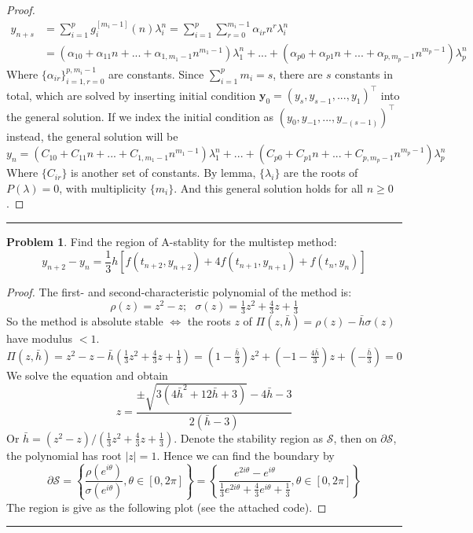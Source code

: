 \documentclass[a4paper, 10pt]{article}
\theoremstyle{definition}
\newtheorem{problem}{Problem}
\theoremstyle{hSol}
\begin{document}
\begin{proof}
\begin{equation}
\begin{split}
    y_{n+s} &= \sum_{i=1}^p g^{[m_i-1]}_i(n) \lambda_i^n = \sum_{i=1}^p  \sum_{r=0}^{m_i-1} \alpha_{ir} n^r \lambda_i^n \\
    &= (\alpha_{10} + \alpha_{11}n + ... + \alpha_{1,m_1-1} n^{m_1-1}) \lambda_1^n + ... + (\alpha_{p0} + \alpha_{p1}n + ... + \alpha_{p,m_p-1} n^{m_p-1}) \lambda_p^n
  \end{split}
\end{equation}
Where $\{\alpha_{ir}\}_{i=1, r=0}^{p, m_i-1}$ are constants. Since $\sum_{i=1}^p m_i = s$, there are $s$ constants in total, which are solved by inserting initial condition $\bm{y}_0=(y_s, y_{s-1}, ..., y_1)^{\top}$ into the general solution. If we index the initial condition as $(y_0, y_{-1}, ..., y_{-(s-1)})^{\top}$ instead, the general solution will be
$$
y_{n} = (C_{10} + C_{11}n + ... + C_{1,m_1-1} n^{m_1-1}) \lambda_1^n + ... + (C_{p0} + C_{p1}n + ... + C_{p,m_p-1} n^{m_p-1}) \lambda_p^n
$$
Where $\{C_{ir}\}$ is another set of constants. By lemma, $\{\lambda_i\}$ are the roots of $P(\lambda)=0$, with multiplicity $\{m_i\}$. And this general solution holds for all $n\geq 0$.

\end{proof}
\noindent\rule{16cm}{0.4pt}

\begin{problem} Find the region of A-stablity for the multistep method:
$$
y_{n+2} - y_n = \frac{1}{3}h [f(t_{n+2}, y_{n+2}) + 4f(t_{n+1}, y_{n+1}) + f(t_n, y_n) ]
$$
\end{problem}
\begin{proof} The first- and second-characteristic polynomial of the method is:
$$
\rho(z) = z^2 - z;~~~\sigma(z) = \tfrac{1}{3}z^2+\tfrac{4}{3}z+\tfrac{1}{3}
$$
So the method is absolute stable $\iff$ the roots $z$ of $\Pi(z,\bar{h})=\rho(z)-\bar{h}\sigma(z)$ have modulus $<1$.
\begin{equation}
  \Pi(z,\bar{h}) = z^2 - z - \bar{h}\left(\tfrac{1}{3}z^2+\tfrac{4}{3}z+\tfrac{1}{3}\right) = (1-\tfrac{\bar{h}}{3})z^2 + (-1-\tfrac{4\bar{h}}{3})z + (-\tfrac{\bar{h}}{3}) = 0
\end{equation}
We solve the equation and obtain
$$
z = \frac{\pm\sqrt{3(4 \bar{h}^2+12 \bar{h}+3)}-4 \bar{h}-3}{2 (\bar{h}-3)}
$$
Or $\bar{h} = (z^2 - z)/(\tfrac{1}{3}z^2+\tfrac{4}{3}z+\tfrac{1}{3})$. Denote the stability region as $\mathcal{S}$, then on $\partial \mathcal{S}$, the polynomial has root $|z|=1$. Hence we can find the boundary by
$$
\partial \mathcal{S} = \left\{\frac{\rho(e^{i\theta})}{\sigma(e^{i\theta})}, \theta\in [0, 2\pi]\right\} =  \left\{\frac{e^{2i\theta} - e^{i\theta}}{\tfrac{1}{3}e^{2i\theta}+\tfrac{4}{3}e^{i\theta}+\tfrac{1}{3}}, \theta\in [0, 2\pi]\right\}
$$
The region is give as the following plot (see the attached code).
\end{proof} 
\noindent\rule{16cm}{0.4pt}
\end{document}
